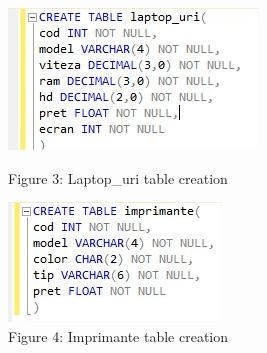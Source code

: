 \begin{figure}[H]
	\centering
		\includegraphics[width=\linewidth]{screens/3.jpg}
		\caption*{Figure 3: Laptop\_uri table creation}
		\label{}
	\endminipage\hfill
		\includegraphics[width=\linewidth]{screens/4.jpg}
		\caption*{Figure 4: Imprimante table creation}
	\endminipage
\end{figure}

